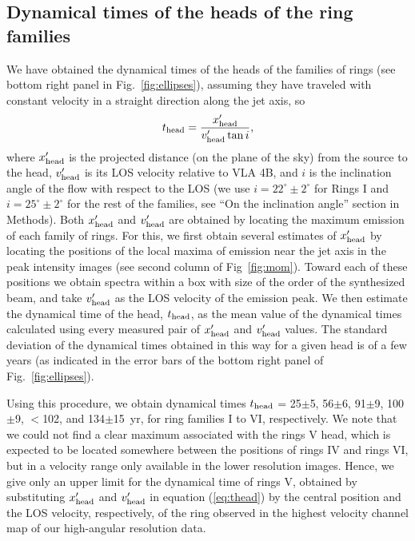 \documentclass[12pt]{mythesis}
\begin{document}
\subsection{Dynamical times of the heads of the ring families}


We have obtained the dynamical times of the heads of the families of rings (see bottom right panel in Fig.~\ref{fig:ellipses}), assuming they have traveled with constant velocity in a straight direction along the jet axis, so
\begin{equation}\label{eq:thead}
	t_{\rm head}=\frac{x'_{\rm head}}{v'_{\rm head}\tan i},
\end{equation}
where $x'_{\rm head}$ is the projected distance (on the plane of the sky) from the source to the head, $v'_{\rm head}$ is its LOS velocity relative to VLA 4B, and $i$ is the inclination angle of the flow with respect to the LOS (we use $i=22^\circ\pm2^\circ$ for Rings I and $i=25^\circ\pm2^\circ$ for the rest of the families, see ``On the inclination angle'' section in Methods). Both $x'_{\rm head}$ and $v'_{\rm head}$ are obtained by locating the maximum emission of each family of rings. For this, we first obtain several
 estimates of $x'_{\rm head}$ by locating the positions of the local maxima of emission near the jet axis in the peak intensity images (see second column of Fig~\ref{fig:mom}). Toward each of these positions we obtain spectra within a box with size of the order of the synthesized beam, and take $v'_{\rm head}$ as the LOS velocity of the emission peak. We then estimate the dynamical time of the head, $t_{\rm head}$, as the mean value of the dynamical times calculated using every measured pair of $x'_{\rm head}$ and $v'_{\rm head}$ values. The standard deviation of the dynamical times obtained in this way for a given head is of a few years (as indicated in the error bars of the bottom right panel of Fig.~\ref{fig:ellipses}). 

Using this procedure, we obtain dynamical times $t_{\rm head}$ = 25$\pm$5, 56$\pm$6, 91$\pm$9, 100$\pm$9, $<$102, and 134$\pm$15~yr, for ring families I to VI, respectively. We note that we could not find a clear maximum associated with the rings V head, which is expected to be located somewhere between the positions of rings IV and rings VI, but in a velocity range only available in the lower resolution images. Hence, we give only an upper limit for the dynamical time of rings V, obtained by substituting $x'_{\rm head}$ and $v'_{\rm head}$ in equation (\ref{eq:thead}) by the central position and 
 the LOS velocity, respectively, of the ring observed in the highest velocity channel map of our high-angular resolution data.
\end{document}
